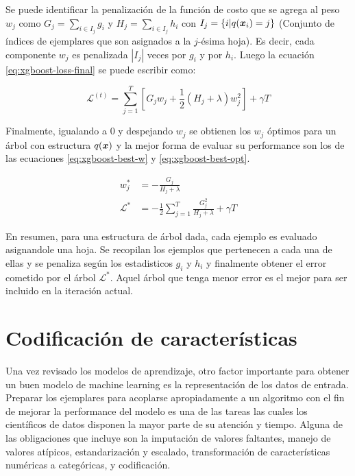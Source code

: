 Se puede identificar la penalización de la función de costo que se agrega al
peso $w_j$ como $G_{j} = \sum_{i \in I_j} g_i$ y $H_j = \sum_{i \in I_j} h_i$
con $I_j = \{i | q(\boldsymbol{x}_i) = j\}$ (Conjunto de índices de ejemplares que son
asignados a la $j$-ésima hoja). Es decir, cada componente $w_j$ es penalizada
$|I_{j}|$ veces por $g_i$ y por $h_i$. Luego la ecuación
\ref{eq:xgboost-loss-final} se puede escribir como:

\begin{equation}
    \mathcal{L}^{(t)} = \sum_{j = 1}^{T}[G_j w_j + \frac{1}{2} (H_j + \lambda)w_j^2] + \gamma T
\end{equation}

Finalmente, igualando a $0$ y despejando $w_j$ se obtienen los $w_j$ óptimos
para un árbol con estructura $q(\boldsymbol{x})$ y la mejor forma de evaluar su
performance son los de las ecuaciones \ref{eq:xgboost-best-w} y
\ref{eq:xgboost-best-opt}.

\begin{align}
    w_{j}^{*} &= - \frac{G_j}{H_j + \lambda} \label{eq:xgboost-best-w}\\
    \mathcal{L}^{*} &= -\frac{1}{2} \sum_{j=1}^{T} \frac{G_{j}^{2}}{H_j + \lambda} + \gamma T \label{eq:xgboost-best-opt}
\end{align}

En resumen, para una estructura de árbol dada, cada ejemplo es evaluado
asignandole una hoja. Se recopilan los ejemplos que pertenecen a cada una de
ellas y se penaliza según los estadisticos $g_i$ y $h_i$ y finalmente obtener el
error cometido por el árbol $\mathcal{L^{*}}$. Aquel árbol que tenga menor error
es el mejor para ser incluido en la iteración actual.

\section{Codificación de características}

Una vez revisado los modelos de aprendizaje, otro factor importante para obtener
un buen modelo de machine learning es la representación de los datos de entrada.
Preparar los ejemplares para acoplarse apropiadamente a un algoritmo con el fin
de mejorar la performance del modelo es una de las tareas las cuales los
científicos de datos disponen la mayor parte de su atención y tiempo. Alguna de
las obligaciones que incluye son la imputación de valores faltantes, manejo de
valores atípicos, estandarización y escalado, transformación de características
numéricas a categóricas, y codificación.

